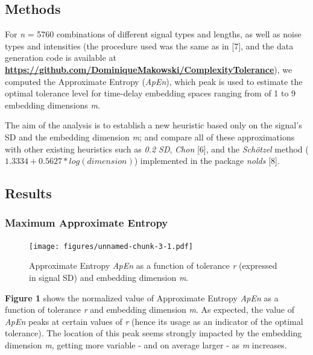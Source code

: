 \documentclass[
  man,floatsintext]{apa6}
\begin{document}
\hypertarget{methods}{%
\subsection{Methods}\label{methods}}

For \emph{n} = 5760 combinations of different signal types and lengths, as well as noise types and intensities (the procedure used was the same as in {[}7{]}, and the data generation code is available at \textbf{\url{https://github.com/DominiqueMakowski/ComplexityTolerance}}), we computed the Approximate Entropy (\emph{ApEn}), which peak is used to estimate the optimal tolerance level for time-delay embedding spaces ranging from of 1 to 9 embedding dimensions \emph{m}.

The aim of the analysis is to establish a new heuristic based only on the signal's SD and the embedding dimension \emph{m}; and compare all of these approximations with other existing heuristics such as \emph{0.2 SD}, \emph{Chon} {[}6{]}, and the \emph{Schötzel} method (\(1.3334 + 0.5627 * log(dimension)\)) implemented in the package \emph{nolds} {[}8{]}.

\hypertarget{results}{%
\subsection{Results}\label{results}}

\hypertarget{maximum-approximate-entropy}{%
\subsubsection{Maximum Approximate Entropy}\label{maximum-approximate-entropy}}

\begin{figure}
\centering
\texttt{[image: figures/unnamed-chunk-3-1.pdf]}
\caption{\label{fig:unnamed-chunk-3}Approximate Entropy \emph{ApEn} as a function of tolerance \emph{r} (expressed in signal SD) and embedding dimension \emph{m}.}
\end{figure}

\textbf{Figure 1} shows the normalized value of Approximate Entropy \emph{ApEn}
as a function of tolerance \emph{r} and embedding dimension \emph{m}. As expected, the value of \emph{ApEn} peaks at certain values of \emph{r} (hence its usage as an indicator of the optimal tolerance). The location of this peak seems strongly impacted by the embedding dimension \emph{m}, getting more variable - and on average larger - as \emph{m} increases.
\end{document}
